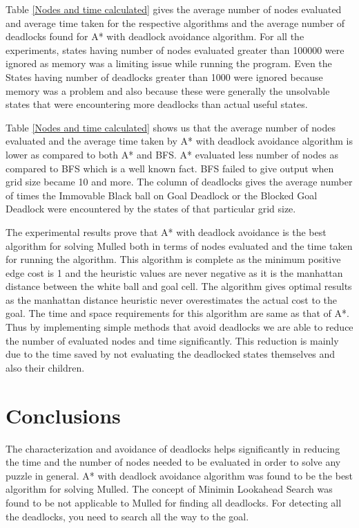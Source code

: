 \documentclass[letterpaper]{article}
\begin{document}
Table \ref{Nodes and time calculated} gives the average number of nodes evaluated and average time taken for the respective algorithms and the average number of deadlocks found for A* with deadlock avoidance algorithm. For all the experiments, states having number of nodes evaluated greater than 100000 were ignored as memory was a limiting issue while running the program. Even the States having number of deadlocks greater than 1000 were ignored because memory was a problem and also because these were generally the unsolvable states that were encountering more deadlocks than actual useful states.

Table \ref{Nodes and time calculated} shows us that the average number of nodes evaluated and the average time taken by A* with deadlock avoidance algorithm is lower as compared to both A* and BFS. A* evaluated less number of nodes as compared to BFS which is a well known fact. BFS failed to give output when grid size became 10 and more. The column of deadlocks gives the average number of  times the Immovable Black ball on Goal Deadlock or the Blocked Goal Deadlock were encountered by the states of that particular grid size.

The experimental results prove that A* with deadlock avoidance is the best algorithm for solving Mulled both in terms of nodes evaluated and the time taken for running the algorithm. This algorithm is complete as the minimum positive edge cost is 1 and the heuristic values are never negative as it is the manhattan distance between the white ball and goal cell. The algorithm gives optimal results as the manhattan distance heuristic never overestimates the actual cost to the goal. The time and space requirements for this algorithm are same as that of A*. Thus by implementing simple methods that avoid deadlocks we are able to reduce the number of evaluated nodes and time significantly. This reduction is mainly due to the time saved by not evaluating the deadlocked states themselves and also their children.   


\section{Conclusions}
The characterization and avoidance of deadlocks helps significantly in reducing the time and the number of nodes needed to be evaluated in order to solve any puzzle in general. A* with deadlock avoidance algorithm was found to be the best algorithm for solving Mulled. The concept of Minimin Lookahead Search was found to be not applicable to Mulled for finding all deadlocks. For detecting all the deadlocks, you need to search all the way to the goal.
\end{document}
